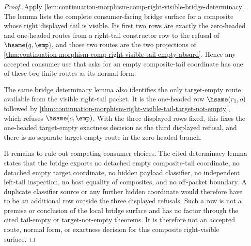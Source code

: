 \begin{proof}
Apply
\autoref{lem:continuation-morphism-comp-right-visible-bridge-determinacy}. The
lemma lists the complete consumer-facing bridge surface for a composite whose
right displayed tail is visible. Its first two rows are exactly the
zero-headed and one-headed routes from a right-tail constructor row to the
refusal of $\hsame(q,\emp)$, and those two routes are the two projections of
\autoref{thm:continuation-morphism-comp-right-visible-tail-empty-absurd}. Hence
any accepted consumer use that asks for an empty composite-tail coordinate has
one of these two finite routes as its normal form.

The same bridge determinacy lemma also identifies the only target-empty route
available from the visible right-tail packet. It is the one-headed row
$\hsame(r_1,o)$ followed by
\autoref{thm:continuation-morphism-right-visible-tail-target-not-empty}, which
refuses $\hsame(c,\emp)$. With the three displayed rows fixed, this fixes the
one-headed target-empty exactness decision as the third displayed refusal, and
there is no separate target-empty route in the zero-headed branch.

It remains to rule out competing consumer choices. The cited determinacy lemma
states that the bridge exports no detached empty composite-tail coordinate, no
detached empty target coordinate, no hidden payload classifier, no independent
left-tail inspection, no host equality of composites, and no off-packet
boundary. A duplicate classifier source or any further hidden coordinate would
therefore have to be an additional row outside the three displayed refusals.
Such a row is not a premise or conclusion of the local bridge surface and has
no factor through the cited tail-empty or target-not-empty theorems. It is
therefore not an accepted route, normal form, or exactness decision for this
composite right-visible surface.
\end{proof}

